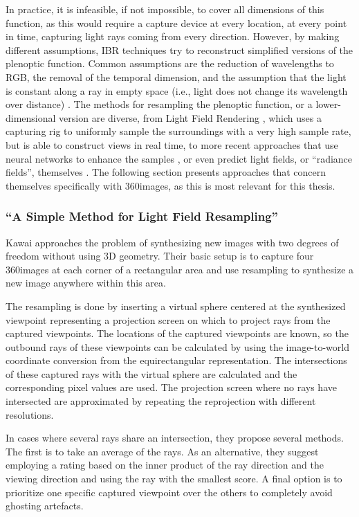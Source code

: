 In practice, it is infeasible, if not impossible, to cover all dimensions of this function, as this would require a capture device at every location, at every point in time, capturing light rays coming from every direction. However, by making different assumptions, IBR techniques try to reconstruct simplified versions of the plenoptic function. Common assumptions are the reduction of wavelengths to RGB, the removal of the temporal dimension, and the assumption that the light is constant along a ray in empty space (i.e., light does not change its wavelength over distance) \cite{survey2004}.
The methods for resampling the plenoptic function, or a lower-dimensional version are diverse, from Light Field Rendering \cite{lightfield}, which uses a capturing rig to uniformly sample the surroundings with a very high sample rate, but is able to construct views in real time, to more recent approaches that use neural networks to enhance the samples \cite{cnn}, or even predict light fields, or ``radiance fields'', themselves \cite{nerf}. The following section presents approaches that concern themselves specifically with 360\degree images, as this is most relevant for this thesis.

\subsubsection{``A Simple Method for Light Field Resampling'' \cite{simple_poster}}
Kawai \cite{simple_poster} approaches the problem of synthesizing new images with two degrees of freedom without using 3D geometry. Their basic setup is to capture four 360\degree images at each corner of a rectangular area and use resampling to synthesize a new image anywhere within this area.

The resampling is done by inserting a virtual sphere centered at the synthesized viewpoint representing a projection screen on which to project rays from the captured viewpoints. The locations of the captured viewpoints are known, so the outbound rays of these viewpoints can be calculated by using the image-to-world coordinate conversion from the equirectangular representation. The intersections of these captured rays with the virtual sphere are calculated and the corresponding pixel values are used. The projection screen where no rays have intersected are approximated by repeating the reprojection with different resolutions.

In cases where several rays share an intersection, they propose several methods. The first is to take an average of the rays. As an alternative, they suggest employing a rating based on the inner product of the ray direction and the viewing direction and using the ray with the smallest score. A final option is to prioritize one specific captured viewpoint over the others to completely avoid ghosting artefacts.

